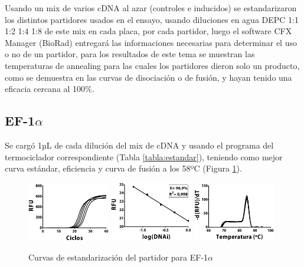 \documentclass[12pt,letterpaper,oneside]{scrbook}
\begin{document}
Usando un mix de varios cDNA al azar (controles e inducidos) se
estandarizaron los distintos partidores usados en el ensayo, usando
diluciones en agua DEPC 1:1 1:2 1:4 1:8 de este mix en cada placa, por
cada partidor, luego el software CFX Manager (BioRad) entregará las
informaciones necesarias para determinar el uso o no de un partidor,
para los resultados de este tema se muestran las temperaturas de
annealing para las cuales los partidores dieron solo un producto, como
se demuestra en las curvas de disociación o de fusión, y hayan tenido
una eficacia cercana al 100\%.

\subsection{EF-1$\alpha$}

Se cargó 1µL de cada dilución del mix de cDNA y usando el programa del
termociclador correspondiente (Tabla \ref{tabla:estandar}), teniendo
como mejor curva estándar, eficiencia y curva de fusión a los 58ºC
(Figura \ref{fig:ef1a}).

\begin{figure}[h]
    \centering
        {\includegraphics[width=0.32\textwidth]{standarization/ef1a/ampl}}
        {\includegraphics[width=0.32\textwidth]{standarization/ef1a/stand}}
        {\includegraphics[width=0.32\textwidth]{standarization/ef1a/melting}}
        \caption{Curvas de estandarización del partidor para EF-1$\alpha$}
    \label {fig:ef1a}
\end{figure}
\end{document}

